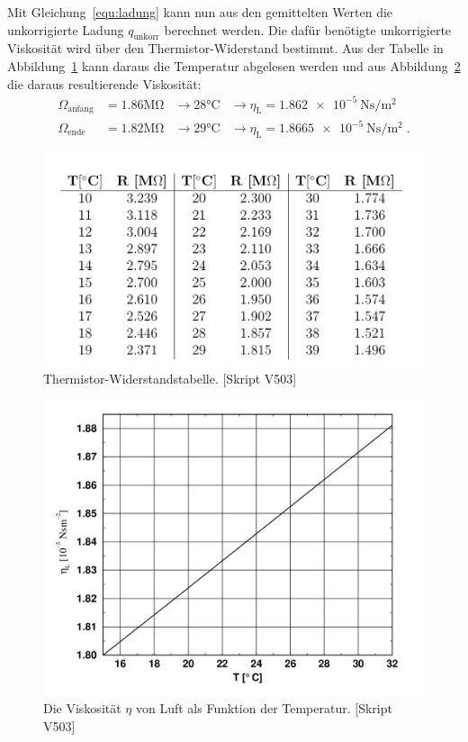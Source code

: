 Mit Gleichung~\eqref{equ:ladung} kann nun aus den gemittelten Werten die unkorrigierte Ladung $q_{\mathrm{unkorr}}$ berechnet werden.
Die dafür benötigte unkorrigierte Viskosität wird über den Thermistor-Widerstand bestimmt. Aus der Tabelle in Abbildung~\ref{fig:T} kann daraus die Temperatur abgelesen werden und aus Abbildung~\ref{fig:eta} die daraus resultierende Viskosität:
\begin{align}
  \Omega_{\mathrm{anfang}} &= 1.86 \si{\mega\ohm} &\to 28 \si{\celsius} &\to \eta_{\mathrm{L}} = \SI{1.862e-5}{\newton\second\per\square\m} \\
  \Omega_{\mathrm{ende}} &= 1.82 \si{\mega\ohm} &\to 29 \si{\celsius} &\to \eta_{\mathrm{L}} = \SI{1.8665e-5}{\newton\second\per\square\m} \; .
\end{align}

\begin{figure}[H]
  \centering
  \includegraphics[width=0.4\textheight]{../figures/tab.png}
  \caption{Thermistor-Widerstandstabelle. [Skript V503]}
\label{fig:T}
\end{figure}

\begin{figure}[H]
  \centering
  \includegraphics[width=0.4\textheight]{../figures/eta.png}
  \caption{Die Viskosität $\eta$ von Luft als Funktion der Temperatur. [Skript V503]}
\label{fig:eta}
\end{figure}

